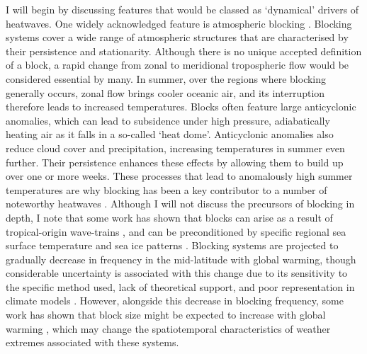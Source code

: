   I will begin by discussing features that would be classed as `dynamical' drivers of heatwaves. One widely acknowledged feature is atmospheric blocking \citep{garriott_long-range_1904,kautz_atmospheric_2022}. Blocking systems cover a wide range of atmospheric structures that are characterised by their persistence and stationarity. Although there is no unique accepted definition of a block, a rapid change from zonal to meridional tropospheric flow would be considered essential by many. In summer, over the regions where blocking generally occurs, zonal flow brings cooler oceanic air, and its interruption therefore leads to increased temperatures. Blocks often feature large anticyclonic anomalies, which can lead to subsidence under high pressure, adiabatically heating air as it falls in a so-called `heat dome'. Anticyclonic anomalies also reduce cloud cover and precipitation, increasing temperatures in summer even further. Their persistence enhances these effects by allowing them to build up over one or more weeks. These processes that lead to anomalously high summer temperatures are why blocking has been a key contributor to a number of noteworthy heatwaves \citep{woollings_blocking_2018}. Although I will not discuss the precursors of blocking in depth, I note that some work has shown that blocks can arise as a result of tropical-origin wave-trains \citep{schneidereit_large-scale_2012,greatbatch_tropical_2015}, and can be preconditioned by specific regional sea surface temperature and sea ice patterns \citep{di_capua_drivers_2021,wang_summer_2020}. Blocking systems are projected to gradually decrease in frequency in the mid-latitude with global warming, though considerable uncertainty is associated with this change due to its sensitivity to the specific method used, lack of theoretical support, and poor representation in climate models \citep{woollings_blocking_2018}. However, alongside this decrease in blocking frequency, some work has shown that block size might be expected to increase with global warming \citep{nabizadeh_size_2019}, which may change the spatiotemporal characteristics of weather extremes associated with these systems.

